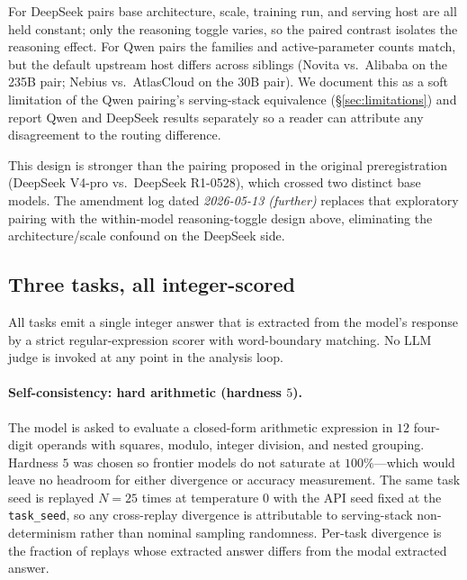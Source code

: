 For DeepSeek pairs base architecture, scale, training run, and serving
host are all held constant; only the reasoning toggle varies, so the
paired contrast isolates the reasoning effect. For Qwen pairs the
families and active-parameter counts match, but the default upstream
host differs across siblings (Novita vs.\ Alibaba on the 235B pair;
Nebius vs.\ AtlasCloud on the 30B pair). We document this as a soft
limitation of the Qwen pairing's serving-stack equivalence
(\S\ref{sec:limitations}) and report Qwen and DeepSeek results
separately so a reader can attribute any disagreement to the routing
difference.

This design is stronger than the pairing proposed in the original
preregistration (DeepSeek V4-pro vs.\ DeepSeek R1-0528),
which crossed two distinct base models. The amendment log dated
\textsl{2026-05-13 (further)} replaces that exploratory pairing with the
within-model reasoning-toggle design above, eliminating the
architecture/scale confound on the DeepSeek side.

\subsection{Three tasks, all integer-scored}
\label{sec:method:tasks}

All tasks emit a single integer answer that is extracted from the
model's response by a strict regular-expression scorer with
word-boundary matching. No LLM judge is invoked at any point in the
analysis loop.

\paragraph{Self-consistency: hard arithmetic (hardness $5$).}
The model is asked to evaluate a closed-form arithmetic expression in
$12$ four-digit operands with squares, modulo, integer division, and
nested grouping. Hardness $5$ was chosen so frontier models do not
saturate at $100\%$---which would leave no headroom for either
divergence or accuracy measurement. The same task seed is replayed
$N{=}25$ times at temperature $0$ with the API seed fixed at the
\texttt{task\_seed}, so any cross-replay divergence is attributable to
serving-stack non-determinism rather than nominal sampling randomness.
Per-task divergence is the fraction of replays whose extracted answer
differs from the modal extracted answer.

